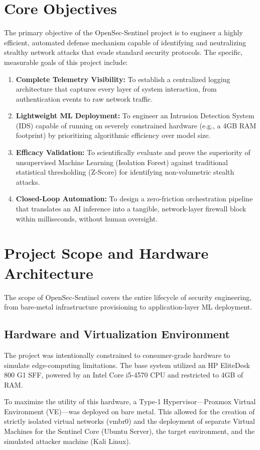 \documentclass[12pt, a4paper]{report}
\begin{document}
	\section{Core Objectives}
	The primary objective of the OpenSec-Sentinel project is to engineer a highly efficient, automated defense mechanism capable of identifying and neutralizing stealthy network attacks that evade standard security protocols. The specific, measurable goals of this project include:
	\begin{enumerate}
		\item \textbf{Complete Telemetry Visibility:} To establish a centralized logging architecture that captures every layer of system interaction, from authentication events to raw network traffic.
		\item \textbf{Lightweight ML Deployment:} To engineer an Intrusion Detection System (IDS) capable of running on severely constrained hardware (e.g., a 4GB RAM footprint) by prioritizing algorithmic efficiency over model size.
		\item \textbf{Efficacy Validation:} To scientifically evaluate and prove the superiority of unsupervised Machine Learning (Isolation Forest) against traditional statistical thresholding (Z-Score) for identifying non-volumetric stealth attacks.
		\item \textbf{Closed-Loop Automation:} To design a zero-friction orchestration pipeline that translates an AI inference into a tangible, network-layer firewall block within milliseconds, without human oversight.
	\end{enumerate}
	
	\section{Project Scope and Hardware Architecture}
	The scope of OpenSec-Sentinel covers the entire lifecycle of security engineering, from bare-metal infrastructure provisioning to application-layer ML deployment.
	
	\subsection{Hardware and Virtualization Environment}
	The project was intentionally constrained to consumer-grade hardware to simulate edge-computing limitations. The base system utilized an HP EliteDesk 800 G1 SFF, powered by an Intel Core i5-4570 CPU and restricted to 4GB of RAM. 
	
	To maximize the utility of this hardware, a Type-1 Hypervisor—Proxmox Virtual Environment (VE)—was deployed on bare metal. This allowed for the creation of strictly isolated virtual networks (vmbr0) and the deployment of separate Virtual Machines for the Sentinel Core (Ubuntu Server), the target environment, and the simulated attacker machine (Kali Linux).
	
\end{document}
